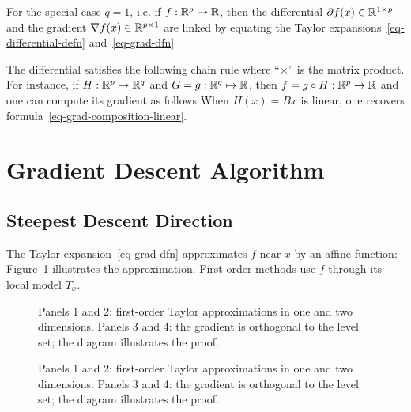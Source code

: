 For the special case $q=1$, i.e. if $f : \mathbb{R}^p \rightarrow \mathbb{R}$, then the differential $\partial f(x) \in \mathbb{R}^{1 \times p}$ and the gradient $\nabla f(x) \in \mathbb{R}^{p \times 1}$ are linked by equating the Taylor expansions~\eqref{eq-differential-defn} and~\eqref{eq-grad-dfn}

The differential satisfies the following chain rule 
where ``$\times$'' is the matrix product. For instance, if $H : \mathbb{R}^p \rightarrow \mathbb{R}^q$ and $G = g : \mathbb{R}^q \mapsto \mathbb{R}$, then $f = g \circ H : \mathbb{R}^p \rightarrow \mathbb{R}$ and one can compute its gradient as follows
When $H(x)=Bx$ is linear, one recovers formula~\eqref{eq-grad-composition-linear}.


\section{Gradient Descent Algorithm}
\label{sec-grad-desc-basic}


\subsection{Steepest Descent Direction}

The Taylor expansion~\eqref{eq-grad-dfn} approximates $f$ near $x$ by an affine function:
Figure~\ref{fig-expansion-taylor} illustrates the approximation. First-order methods use $f$ through its local model $T_x$.


\begin{figure}[tbp]
\centering
{}\hfill
{}
\caption{Panels 1 and 2: first-order Taylor approximations in one and two dimensions.
	Panels 3 and 4: the gradient is orthogonal to the level set; the diagram illustrates the proof.}
\label{fig-expansion-taylor}
\end{figure}
\begin{figure}[tbp]
\BookContinuedFigure
\centering
{}\hfill
{}
\caption{Panels 1 and 2: first-order Taylor approximations in one and two dimensions.
	Panels 3 and 4: the gradient is orthogonal to the level set; the diagram illustrates the proof.}
\label{fig-expansion-taylor-continued}
\end{figure}

